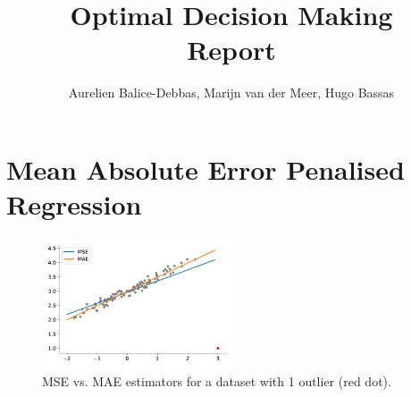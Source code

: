\documentclass[10pt]{article}
\begin{document}
	
  \renewcommand{\qedsymbol}{\smiley}
	\title{Optimal Decision Making \\ Report}
	\author{Aurelien Balice-Debbas, Marijn van der Meer, Hugo Bassas}
	
	\maketitle

\section{Mean Absolute Error Penalised Regression}

\begin{figure}[!ht]
  \centering
  \includegraphics[width=0.5\textwidth]{doc/images/im1_.png}
  \caption{MSE vs. MAE estimators for a dataset with 1 outlier (red dot). }
  \vspace{-3mm}
  \label{fig:mae-mse}
\end{figure}
\end{document}
